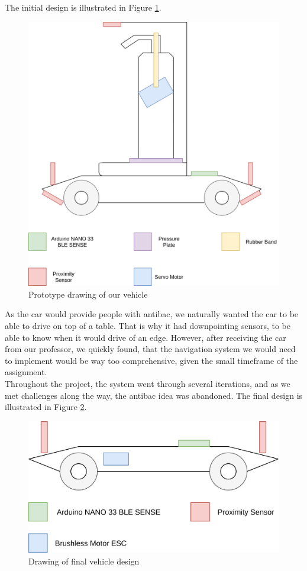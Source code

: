 \documentclass{article}
\begin{document}
The initial design is illustrated in Figure \ref{ProtoDrawing}.

\begin{figure}[H]
	\centering
	\includegraphics[width=\linewidth]{prototype-drawing.png}
	\caption{Prototype drawing of our vehicle}
	\label{ProtoDrawing}
\end{figure}

As the car would provide people with antibac, we naturally wanted the car to be able to drive on top of a table. That is why it had downpointing sensors, to be able to know when it would drive of an edge. However, after receiving the car from our professor, we quickly found, that the navigation system we would need to implement would be way too comprehensive, given the small timeframe of the assignment.\\

Throughout the project, the system went through several iterations, and as we met challenges along the way, the antibac idea was abandoned. The final design is illustrated in Figure \ref{final-design}.

\begin{figure}[H]
	\centering
	\includegraphics[width=\linewidth]{final-design.png}
    \caption{Drawing of final vehicle design}
	\label{final-design}
\end{figure}
\end{document}
